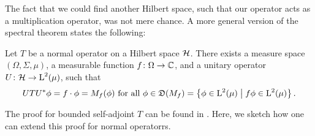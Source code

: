 The fact that we could find another Hilbert space, such that our operator
acts as a multiplication operator, was not mere chance. A more general 
version of the spectral theorem states the following:

\begin{thrm}
\label{uspecmult}
Let $T$ be a normal operator on a Hilbert space $\mathcal{H}$. There exists
a measure space $(\Omega, \Sigma, \mu)$, a measurable function 
$f\colon \Omega \to \mathbb{C}$, and a unitary operator $U\colon \mathcal{H} \to \text{L}^2(\mu)$,
such that
\[
UTU^{*} \phi = f \cdot \phi = M_f(\phi) \text{ for all }\phi \in \mathfrak{D}(M_f) 
 = \left\lbrace \phi \in \text{L}^2(\mu) \bigm | f\phi \in \text{L}^2(\mu) \right\rbrace.
\]
\end{thrm}
The proof for bounded self-adjoint $T$ can be found in \cite[Ch. VII.1]{WernerFunkAna}.
Here, we sketch how one can extend this proof for normal operatorrs.

